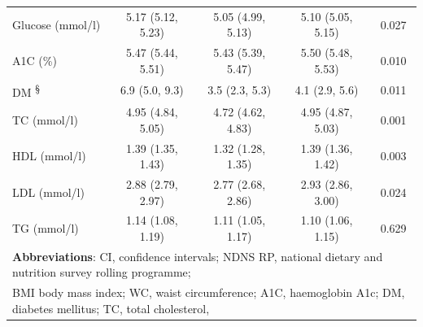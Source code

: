 \begin{table}[H]
\begin{tabular}[t]{lcccc}
		Glucose (mmol/l) & 5.17 (5.12, 5.23) & 5.05 (4.99, 5.13) & 5.10 (5.05, 5.15) & 0.027\\
		A1C (\%) & 5.47 (5.44, 5.51) & 5.43 (5.39, 5.47) & 5.50 (5.48, 5.53) & 0.010\\
		DM \textsuperscript{\S} & 6.9 (5.0, 9.3) & 3.5 (2.3, 5.3) & 4.1 (2.9, 5.6) & 0.011\\
		TC (mmol/l) & 4.95 (4.84, 5.05) & 4.72 (4.62, 4.83) & 4.95 (4.87, 5.03) & 0.001 \\
		HDL (mmol/l) & 1.39 (1.35, 1.43)& 1.32 (1.28, 1.35) & 1.39 (1.36, 1.42)& 0.003 \\ 
		LDL (mmol/l) &  2.88 (2.79, 2.97) & 2.77 (2.68, 2.86) & 2.93 (2.86, 3.00)& 0.024 \\ 
		TG (mmol/l) &  1.14 (1.08, 1.19) &  1.11 (1.05, 1.17) & 1.10 (1.06, 1.15) & 0.629\\
		\bottomrule
		\multicolumn{5}{l}{{\scriptsize \textbf{Abbreviations}: CI, confidence intervals; NDNS RP, national dietary and nutrition survey rolling programme;}}\\
		\multicolumn{5}{l}{{\scriptsize BMI body mass index; WC, waist circumference; A1C, haemoglobin A1c; DM, diabetes mellitus; TC, total cholesterol, }}\\

\end{tabular}
\end{table}

